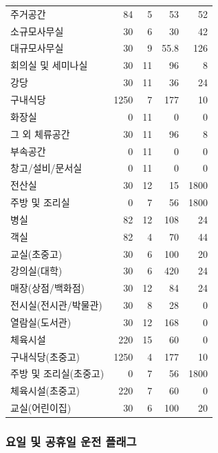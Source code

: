 \begin{defaulttable}
{\begin{tabularx}{\textwidth}{Xrrrr}
    주거공간                & 84   & 5  & 53   & 52   \\
    소규모사무실            & 30   & 6  & 30   & 42   \\
    대규모사무실            & 30   & 9  & 55.8 & 126  \\
    회의실 및 세미나실      & 30   & 11 & 96   & 8    \\
    강당                    & 30   & 11 & 36   & 24   \\
    구내식당                & 1250 & 7  & 177  & 10   \\
    화장실                  & 0    & 11 & 0    & 0    \\
    그 외 체류공간          & 30   & 11 & 96   & 8    \\
    부속공간                & 0    & 11 & 0    & 0    \\
    창고/설비/문서실        & 0    & 11 & 0    & 0    \\
    전산실                  & 30   & 12 & 15   & 1800 \\
    주방 및 조리실          & 0    & 7  & 56   & 1800 \\
    병실                    & 82   & 12 & 108  & 24   \\
    객실                    & 82   & 4  & 70   & 44   \\
    교실(초중고)            & 30   & 6  & 100  & 20   \\
    강의실(대학)            & 30   & 6  & 420  & 24   \\
    매장(상점/백화점)       & 30   & 12 & 84   & 24   \\
    전시실(전시관/박물관)   & 30   & 8  & 28   & 0    \\
    열람실(도서관)          & 30   & 12 & 168  & 0    \\
    체육시설                & 220  & 15 & 60   & 0    \\
    구내식당(초중고)        & 1250 & 4  & 177  & 10   \\
    주방 및 조리실(초중고)  & 0    & 7  & 56   & 1800 \\
    체육시설(초중고)        & 220  & 7  & 60   & 0    \\
    교실(어린이집)          & 30   & 6  & 100  & 20   \\

    \bottomrule
  \end{tabularx}
  }
\end{defaulttable}

\subsubsection{요일 및 공휴일 운전 플래그}

